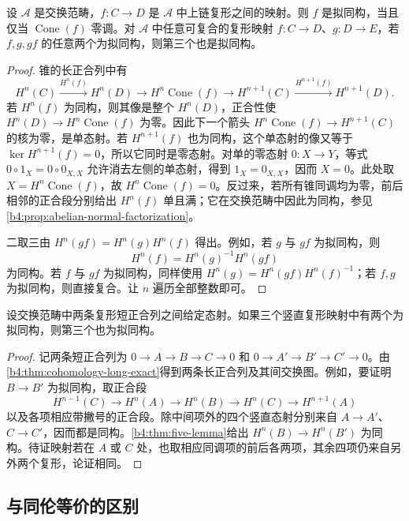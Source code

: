 \begin{proposition}\label{b4:prop:cone-quasi-isomorphism}
	设 \(\mathcal A\) 是交换范畴，\(f:C\to D\) 是 \(\mathcal A\) 中上链复形之间的映射。则 \(f\) 是拟同构，当且仅当 \(\operatorname{Cone}(f)\) 零调。对 \(\mathcal A\) 中任意可复合的复形映射 \(f:C\to D\)、\(g:D\to E\)，若 \(f,g,gf\) 的任意两个为拟同构，则第三个也是拟同构。
\end{proposition}
\begin{proof}
	锥的长正合列中有
	\[
		H^n(C)\xrightarrow{H^n(f)}H^n(D)\to H^n\operatorname{Cone}(f)\to H^{n+1}(C) \xrightarrow{H^{n+1}(f)}H^{n+1}(D).
	\]
	若 \(H^n(f)\) 为同构，则其像是整个 \(H^n(D)\)，正合性使 \(H^n(D)\to H^n\operatorname{Cone}(f)\) 为零。因此下一个箭头 \(H^n\operatorname{Cone}(f)\to H^{n+1}(C)\) 的核为零，是单态射。若 \(H^{n+1}(f)\) 也为同构，这个单态射的像又等于 \(\ker H^{n+1}(f)=0\)，所以它同时是零态射。对单的零态射 \(0:X\to Y\)，等式 \(0\circ1_X=0\circ0_{X,X}\) 允许消去左侧的单态射，得到 \(1_X=0_{X,X}\)，因而 \(X=0\)。此处取 \(X=H^n\operatorname{Cone}(f)\)，故 \(H^n\operatorname{Cone}(f)=0\)。反过来，若所有锥同调均为零，前后相邻的正合段分别给出 \(H^n(f)\) 单且满；它在交换范畴中因此为同构，参见\cref{b4:prop:abelian-normal-factorization}。

	二取三由 \(H^n(gf)=H^n(g)H^n(f)\) 得出。例如，若 \(g\) 与 \(gf\) 为拟同构，则
	\[
		H^n(f)=H^n(g)^{-1}H^n(gf)
	\]
	为同构。若 \(f\) 与 \(gf\) 为拟同构，同样使用 \(H^n(g)=H^n(gf)H^n(f)^{-1}\)；若 \(f,g\) 为拟同构，则直接复合。让 \(n\) 遍历全部整数即可。
\end{proof}

\begin{proposition}\label{b4:prop:short-exact-quasi-comparison}
	设交换范畴中两条复形短正合列之间给定态射。如果三个竖直复形映射中有两个为拟同构，则第三个也为拟同构。
\end{proposition}
\begin{proof}
	记两条短正合列为 \(0\to A\to B\to C\to0\) 和 \(0\to A'\to B'\to C'\to0\)。由\cref{b4:thm:cohomology-long-exact}得到两条长正合列及其间交换图。例如，要证明 \(B\to B'\) 为拟同构，取正合段
	\[
		H^{n-1}(C)\longrightarrow H^n(A)\longrightarrow H^n(B) \longrightarrow H^n(C)\longrightarrow H^{n+1}(A)
	\]
	以及各项相应带撇号的正合段。除中间项外的四个竖直态射分别来自 \(A\to A'\)、\(C\to C'\)，因而都是同构。\cref{b4:thm:five-lemma}给出 \(H^n(B)\to H^n(B')\) 为同构。待证映射若在 \(A\) 或 \(C\) 处，也取相应同调项的前后各两项，其余四项仍来自另外两个复形，论证相同。
\end{proof}

\subsection{与同伦等价的区别}
\label{b4:subsec:0603:02}

